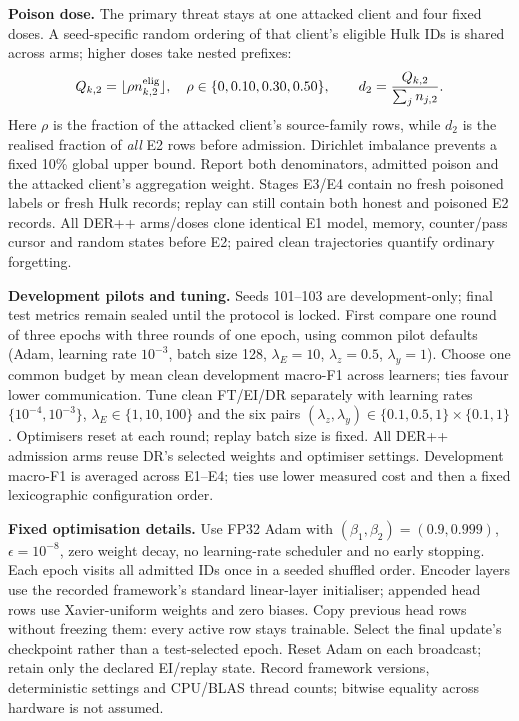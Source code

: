 \documentclass[10pt,a4paper]{article}
\begin{document}
\textbf{Poison dose.} The primary threat stays at one attacked client and four fixed doses. A seed-specific random ordering of that client's eligible Hulk IDs is shared across arms; higher doses take nested prefixes:
\begin{equation}
Q_{k,2}=\lfloor\rho n^{\rm elig}_{k,2}\rfloor,\quad
\rho\in\{0,0.10,0.30,0.50\},\qquad
d_2=\frac{Q_{k,2}}{\sum_j n_{j,2}}.
\label{eq:dose}
\end{equation}
Here $\rho$ is the fraction of the attacked client's source-family rows, while $d_2$ is the realised fraction of \emph{all} E2 rows before admission. Dirichlet imbalance prevents a fixed 10\% global upper bound. Report both denominators, admitted poison and the attacked client's aggregation weight. Stages E3/E4 contain no fresh poisoned labels or fresh Hulk records; replay can still contain both honest and poisoned E2 records. All DER++ arms/doses clone identical E1 model, memory, counter/pass cursor and random states before E2; paired clean trajectories quantify ordinary forgetting.

\textbf{Development pilots and tuning.} Seeds 101--103 are development-only; final test metrics remain sealed until the protocol is locked. First compare one round of three epochs with three rounds of one epoch, using common pilot defaults (Adam, learning rate $10^{-3}$, batch size 128, $\lambda_E=10$, $\lambda_z=0.5$, $\lambda_y=1$). Choose one common budget by mean clean development macro-F1 across learners; ties favour lower communication. Tune clean FT/EI/DR separately with learning rates $\{10^{-4},10^{-3}\}$, $\lambda_E\in\{1,10,100\}$ and the six pairs $(\lambda_z,\lambda_y)\in\{0.1,0.5,1\}\times\{0.1,1\}$. Optimisers reset at each round; replay batch size is fixed. All DER++ admission arms reuse DR's selected weights and optimiser settings. Development macro-F1 is averaged across E1--E4; ties use lower measured cost and then a fixed lexicographic configuration order.

\textbf{Fixed optimisation details.} Use FP32 Adam with $(\beta_1,\beta_2)=(0.9,0.999)$, $\epsilon=10^{-8}$, zero weight decay, no learning-rate scheduler and no early stopping. Each epoch visits all admitted IDs once in a seeded shuffled order. Encoder layers use the recorded framework's standard linear-layer initialiser; appended head rows use Xavier-uniform weights and zero biases. Copy previous head rows without freezing them: every active row stays trainable. Select the final update's checkpoint rather than a test-selected epoch. Reset Adam on each broadcast; retain only the declared EI/replay state. Record framework versions, deterministic settings and CPU/BLAS thread counts; bitwise equality across hardware is not assumed.
\end{document}
